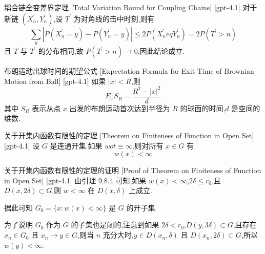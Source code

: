 \documentclass[UTF8]{ctexart}
\begin{document}
    
    
    \begin{thm}
        {耦合链全变差界定理}
        [Total Variation Bound for Coupling Chains]
        [gpt-4.1]
        对于新链 $( X _ { n } ^ { \prime } , Y _ { n } ^ { \prime } )$,设 $T ^ { \prime }$ 为对角线的击中时刻,则有
\[
\sum _ { y } | P ( X _ { n } ^ { \prime } = y ) - P ( Y _ { n } ^ { \prime } = y ) | \leq 2 P ( X _ { n } ^ { \prime } 
eq Y _ { n } ^ { \prime } ) = 2 P ( T ^ { \prime } > n )
\]
且 $T$ 与 $T ^ { \prime }$ 的分布相同,故 $P ( T ^ { \prime } > n ) \to 0$,因此结论成立.
    \end{thm}
    
    
    
    \begin{thm}
        {布朗运动出球时间的期望公式}
        [Expectation Formula for Exit Time of Brownian Motion from Ball]
        [gpt-4.1]
        如果 $|x| < R$,则
\[
E_{x} S_{R} = \frac{R^{2} - |x|^{2}}{d}
\]
其中 $S_{R}$ 表示从点 $x$ 出发的布朗运动首次达到半径为 $R$ 的球面的时间,$d$ 是空间的维数.

    \end{thm}
    
    
    
    \begin{thm}
        {关于开集内函数有限性的定理}
        [Theorem on Finiteness of Function in Open Set]
        [gpt-4.1]
        设 $G$ 是连通开集.如果 $w 
ot\equiv \infty$,则对所有 $x \in G$ 有
\[
w(x) < \infty
\]

    \end{thm}
    
    
    
    \begin{prf}
        {关于开集内函数有限性的定理的证明}
        [Proof of Theorem on Finiteness of Function in Open Set]
        [gpt-4.1]
        由引理 9.8.4 可知,如果 $w(x) < \infty$,$2\delta \leq r_{0}$,且 $D(x, 2\delta) \subset G$,则 $w < \infty$ 在 $D(x, \delta)$ 上成立.

据此可知 $G_{0} = \{ x : w(x)<\infty \}$ 是 $G$ 的开子集.

为了说明 $G_{0}$ 作为 $G$ 的子集也是闭的,注意到如果 $2\delta < r_{0}$,$D(y, 3\delta) \subset G$,且存在 $x_{n} \in G_{0}$ 且 $x_{n} \to y \in G$,则当 $n$ 充分大时,$y \in D(x_{n}, \delta)$ 且 $D(x_{n}, 2\delta) \subset G$,所以 $w(y) < \infty$.

    \end{prf}
    
\end{document}
